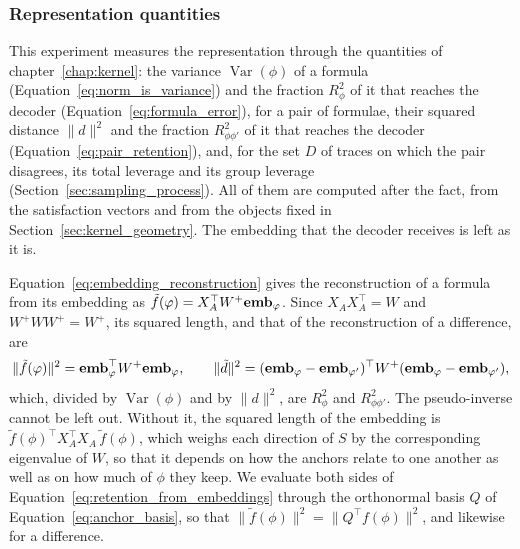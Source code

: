 \documentclass[titlepage,a4paper,11pt]{report}
\newenvironment{RSnewblock}{\par\color{blue!65!black}}{\par}
\begin{document}
    \subsubsection{Representation quantities}
    \begin{RSnewblock}
    This experiment measures the representation through the quantities of chapter~\ref{chap:kernel}: the variance $\operatorname{Var}(\phi)$ of a formula (Equation~\eqref{eq:norm_is_variance}) and the fraction $R^2_\phi$ of it that reaches the decoder (Equation~\eqref{eq:formula_error}), for a pair of formulae, their squared distance $\lVert d\rVert^2$ and the fraction $R^2_{\phi\phi'}$ of it that reaches the decoder (Equation~\eqref{eq:pair_retention}), and, for the set $D$ of traces on which the pair disagrees, its total leverage and its group leverage (Section~\ref{sec:sampling_process}). All of them are computed after the fact, from the satisfaction vectors and from the objects fixed in Section~\ref{sec:kernel_geometry}. The embedding that the decoder receives is left as it is.

    Equation~\eqref{eq:embedding_reconstruction} gives the reconstruction of a formula from its embedding as $\tilde f(\varphi)=X_A^\top W^{+}\textbf{emb}_\varphi$. Since $X_AX_A^\top=W$ and $W^{+}WW^{+}=W^{+}$, its squared length, and that of the reconstruction of a difference, are
    \begin{equation}\label{eq:retention_from_embeddings}
        \lVert\tilde f(\varphi)\rVert^2=\textbf{emb}_\varphi^\top W^{+}\textbf{emb}_\varphi,
        \qquad
        \lVert\tilde d\rVert^2=(\textbf{emb}_\varphi-\textbf{emb}_{\varphi'})^\top W^{+}(\textbf{emb}_\varphi-\textbf{emb}_{\varphi'}),
    \end{equation}
    which, divided by $\operatorname{Var}(\phi)$ and by $\lVert d\rVert^2$, are $R^2_\phi$ and $R^2_{\phi\phi'}$. The pseudo-inverse cannot be left out. Without it, the squared length of the embedding is $\tilde f(\phi)^\top X_A^\top X_A\,\tilde f(\phi)$, which weighs each direction of $S$ by the corresponding eigenvalue of $W$, so that it depends on how the anchors relate to one another as well as on how much of $\phi$ they keep. We evaluate both sides of Equation~\eqref{eq:retention_from_embeddings} through the orthonormal basis $Q$ of Equation~\eqref{eq:anchor_basis}, so that $\lVert\tilde f(\phi)\rVert^2=\lVert Q^\top f(\phi)\rVert^2$, and likewise for a difference.


\end{RSnewblock}
\end{document}
